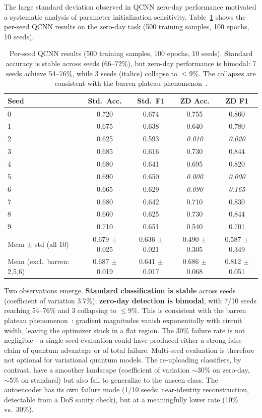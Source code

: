 The large standard deviation observed in QCNN zero-day performance motivated a systematic analysis of parameter initialization sensitivity. Table~\ref{tab:res_seeds} shows the per-seed QCNN results on the zero-day task (500 training samples, 100 epochs, 10 seeds).

\begin{table}[ht]
\centering
\begin{tabular}{lcccc}
    \toprule
    \textbf{Seed} & \textbf{Std.\ Acc.} & \textbf{Std.\ F1} & \textbf{ZD Acc.} & \textbf{ZD F1} \\
    \midrule
    0 & 0.720 & 0.674 & 0.755 & 0.860 \\
    1 & 0.675 & 0.638 & 0.640 & 0.780 \\
    2 & 0.625 & 0.593 & \textit{0.010} & \textit{0.020} \\
    3 & 0.685 & 0.616 & 0.730 & 0.844 \\
    4 & 0.680 & 0.641 & 0.695 & 0.820 \\
    5 & 0.690 & 0.650 & \textit{0.000} & \textit{0.000} \\
    6 & 0.665 & 0.629 & \textit{0.090} & \textit{0.165} \\
    7 & 0.680 & 0.642 & 0.710 & 0.830 \\
    8 & 0.660 & 0.625 & 0.730 & 0.844 \\
    9 & 0.710 & 0.651 & 0.540 & 0.701 \\
    \midrule
    Mean $\pm$ std (all 10)         & 0.679 $\pm$ 0.025 & 0.636 $\pm$ 0.021 & 0.490 $\pm$ 0.305 & 0.587 $\pm$ 0.349 \\
    Mean (excl.\ barren: 2,5,6) & 0.687 $\pm$ 0.019 & 0.641 $\pm$ 0.017 & 0.686 $\pm$ 0.068 & 0.812 $\pm$ 0.051 \\
    \bottomrule
\end{tabular}
\caption{Per-seed QCNN results (500 training samples, 100 epochs, 10 seeds). Standard accuracy is stable across seeds (66--72\%), but zero-day performance is bimodal: 7 seeds achieve 54--76\%, while 3 seeds (italics) collapse to $\leq 9\%$. The collapses are consistent with the barren plateau phenomenon~\cite{mcclean2018barren}.}
\label{tab:res_seeds}
\end{table}

Two observations emerge. \textbf{Standard classification is stable} across seeds (coefficient of variation 3.7\%); \textbf{zero-day detection is bimodal}, with 7/10 seeds reaching 54--76\% and 3 collapsing to $\leq 9\%$. This is consistent with the barren plateau phenomenon~\cite{mcclean2018barren}: gradient magnitudes vanish exponentially with circuit width, leaving the optimizer stuck in a flat region. The 30\% failure rate is not negligible---a single-seed evaluation could have produced either a strong false claim of quantum advantage or of total failure. Multi-seed evaluation is therefore not optional for variational quantum models. The re-uploading classifiers, by contrast, have a smoother landscape (coefficient of variation ${\sim}30\%$ on zero-day, ${\sim}5\%$ on standard) but also fail to generalize to the unseen class. The autoencoder has its own failure mode (1/10 seeds: near-identity reconstruction, detectable from a DoS sanity check), but at a meaningfully lower rate (10\% vs.\ 30\%).

